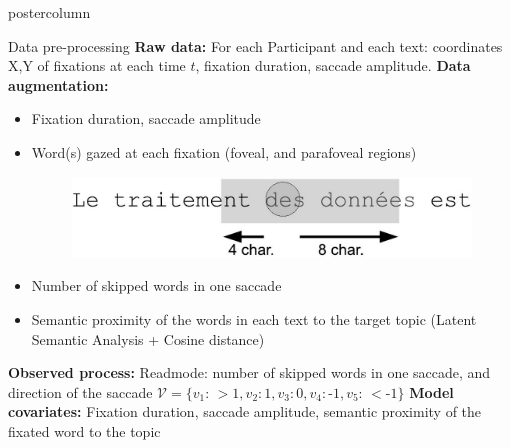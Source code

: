 \documentclass[final,hyperref={pdfpagelabels=false}]{beamer}
\begin{document}
\begin{frame}
\begin{columns}
\begin{column}{.50\textwidth}
\begin{beamercolorbox}[center,wd=\textwidth]{postercolumn}
\begin{minipage}[T]{.98\textwidth}
{            \vfill
            \begin{block}{Data pre-processing}
                \textbf{Raw data:} For each Participant and each text: coordinates X,Y of fixations at each time $t$,
                fixation duration, saccade amplitude.
                \vskip0.5cm
                \textbf{Data augmentation:}
                \begin{itemize}
                    \item[\bullet] Fixation duration, saccade amplitude
                    \item[\bullet]
                    \begin{minipage}{0.50\textwidth}
                        Word(s) gazed at each fixation (foveal, and parafoveal regions)
                    \end{minipage}
                    \begin{minipage}{0.40\textwidth}
                        \begin{figure}[H]
                            \includegraphics[width=0.8\linewidth]{fixation_window.jpg}
                        \end{figure}
                    \end{minipage}
                    \item[\bullet] Number of skipped words in one saccade
                    \item[\bullet] Semantic proximity of the words in each text to the target topic (Latent Semantic Analysis + Cosine distance)
                \end{itemize}
                \vskip0.5cm
                \textbf{Observed process:} Readmode:  number of skipped words in one saccade, and direction of the saccade
                $\mathcal{V} =\{ v_1:\,> \text{1}, v_2: \text{1}, v_3: \text{0}, v_4: \text{-1}, v_5:\,< \text{-1}\} $
                \vskip0.5cm
                \textbf{Model covariates:} Fixation duration, saccade amplitude, semantic proximity of the fixated word to the topic


\end{block}}
\end{minipage}
\end{beamercolorbox}
\end{column}
\end{columns}
\end{frame}
\end{document}
